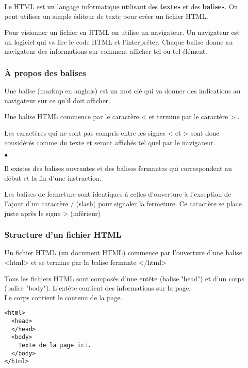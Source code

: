 \documentclass[10pt,dvipsnames, dvips, svgnames]{article}
\begin{document}
Le HTML est un langage informatique utilisant des \textbf{textes} et des \textbf{balises}. On peut utiliser un simple éditeur de texte pour créer un fichier HTML.


Pour visionner un fichier en HTML on utilise un navigateur. Un navigateur est un logiciel qui va lire le code HTML et l'interpréter. Chaque balise donne au navigateur des informations sur comment afficher tel ou tel élément.

\subsubsection{À propos des balises}

Une balise (markup en anglais) est un mot clé qui va donner des indications au navigateur sur ce qu'il doit afficher.

Une balise HTML commence par le caractère \og < \fg et termine par le caractère \og > \fg .

Les caractères qui ne sont pas compris entre les signes \og < \fg et \og > \fg sont donc considérés comme du texte et seront affichés tel quel par le navigateur.


\begin{list}{$\bullet$}{}
	\item  Il existes des balises ouvrantes et des balises fermantes qui correspondent au début et la fin d'une instruction.
	\item Les balises de fermeture sont identiques à celles d'ouverture à l'exception de l'ajout d'un caractère \og / \fg (slash) pour signaler la fermeture. Ce caractère se place juste après le signe \og > \fg (inférieur)
	\end{list}

\subsubsection{Structure d'un fichier HTML}

Un fichier HTML (un document HTML) commence par l'ouverture d'une balise <html> et se termine par la balise fermante </html> 

Tous les fichiers HTML sont composés d'une entête (balise "head") et d'un corps (balise "body"). L'entête contient des informations sur la page.\\
Le corps contient le contenu de la page.

\begin{lstlisting}
<html>
  <head>
  </head>
  <body>
    Texte de la page ici.
  </body>
</html>
\end{lstlisting}
\end{document}
